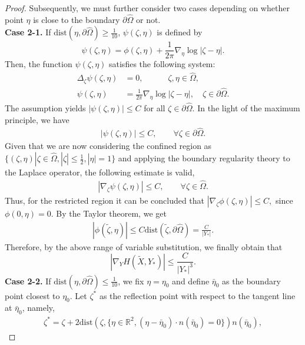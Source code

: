 \documentclass[10pt,a4paper]{amsart}
\begin{document}
\begin{proof}
Subsequently, we must further consider two cases depending on whether point $\eta$ is close to the boundary $\partial\hat{\Omega}$ or not.
\\
{\bf Case 2-1.} If $\text{dist}(\eta,\partial\hat{\Omega})\geq\frac{1}{10}$, $\psi(\zeta,\eta)$ is defined by
$$\psi(\zeta,\eta)=\phi(\zeta,\eta)+\frac{1}{2\pi}\nabla_{\eta}\log|\zeta-\eta|.$$
Then, the function $\psi(\zeta,\eta)$ satisfies the following system:
\begin{align}
\Delta_{\zeta}\psi(\zeta,\eta)&=0, \qquad \quad \zeta,\eta\in\hat{\Omega},\nonumber\\
\psi(\zeta,\eta)&=\frac{1}{2\pi}\nabla_{\eta}\log|\zeta-\eta|,\quad \zeta\in\partial\hat{\Omega}.\nonumber
\end{align}
The assumption yields $|\psi(\zeta,\eta)|\leq C$ for all $\zeta\in\partial\hat{\Omega}$. In the light of the maximum principle, we have
\begin{align}
|\psi(\zeta,\eta)|\leq C, \qquad \forall \zeta\in\partial\hat{\Omega}.\nonumber
\end{align}
Given that we are now considering the confined region as $\{(\zeta,\eta)|\zeta\in\hat{\Omega}, |\zeta|\leq\frac{1}{2},|\eta|=1\}$ and applying the boundary regularity theory to the Laplace operator, the following estimate is valid,
\begin{align}
|\nabla_{\zeta}\psi(\zeta,\eta)|\leq C,  \qquad \forall \zeta\in\hat{\Omega}.\nonumber
\end{align}
Thus, for the restricted region it can be concluded that $|\nabla_{\zeta}\phi(\zeta,\eta)|\leq C,$  since $\phi(0,\eta)=0$. By the Taylor theorem, we get
\begin{align}
|\phi(\tilde{\zeta},\eta)|\leq C \text{dist}(\tilde{\zeta},\partial\hat{\Omega})=\frac{C}{|Y_{*}|}.\nonumber
\end{align}
Therefore, by the above range of variable substitution, we finally obtain that
$$|\nabla_{Y}H(\tilde{X},Y_{*})|\leq\frac{C}{|Y_{*}|^{3}}.$$
%
{\bf Case 2-2.} If $\text{dist}(\eta,\partial\hat{\Omega})\leq\frac{1}{10}$, we fix $\eta=\eta_{0}$ and define $\bar{\eta}_{0}$ as the boundary point closest to $\eta_{0}$.
 Let $\zeta^{*}$ as the reflection point
with respect to the tangent line at $\bar{\eta}_{0}$, namely,
\begin{align}
\zeta^{*}=\zeta+2\text{dist}(\zeta,\{\eta\in \mathbb{R}^{2},(\eta-\bar{\eta}_{0})\cdot n(\bar{\eta}_{0})=0\})n(\bar{\eta}_{0}),\nonumber

\end{align}
\end{proof}
\end{document}
